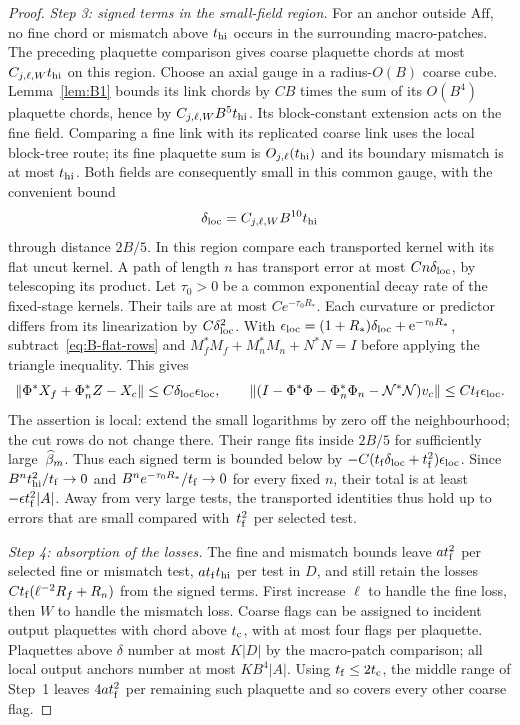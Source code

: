 \begin{proof}
\emph{Step 3: signed terms in the small-field region.} For an anchor outside $\mathrm{Aff}$, no fine chord or mismatch above $t_{\rm hi}$ occurs in the surrounding macro-patches. The preceding plaquette comparison gives coarse plaquette chords at most $C_{j,\ell,W}t_{\rm hi}$ on this region. Choose an axial gauge in a radius-$O(B)$ coarse cube. Lemma~\ref{lem:B1} bounds its link chords by $C B$ times the sum of its $O(B^4)$ plaquette chords, hence by $C_{j,\ell,W}B^5t_{\rm hi}$. Its block-constant extension acts on the fine field. Comparing a fine link with its replicated coarse link uses the local block-tree route; its fine plaquette sum is $O_{j,\ell}(t_{\rm hi})$ and its boundary mismatch is at most $t_{\rm hi}$. Both fields are consequently small in this common gauge, with the convenient bound
\begin{equation*}
\delta_{\rm loc}=C_{j,\ell,W}B^{10}t_{\rm hi}
\end{equation*}
through distance $2B/5$. In this region compare each transported kernel with its flat uncut kernel. A path of length $n$ has transport error at most $Cn\delta_{\rm loc}$, by telescoping its product. Let $\tau_0>0$ be a common exponential decay rate of the fixed-stage kernels. Their tails are at most $Ce^{-\tau_0 R_*}$. Each curvature or predictor differs from its linearization by $C\delta_{\rm loc}^2$. With $\epsilon_{\rm loc}=(1+R_*)\delta_{\rm loc}+\mathrm e^{-\tau_0R_*}$, subtract~\eqref{eq:B-flat-rows} and $M_f^*M_f+M_n^*M_n+N^*N=I$ before applying the triangle inequality. This gives
\begin{equation*}
\|\Phi^*X_f+\Phi_n^*Z-X_c\|\le C\delta_{\rm loc}\epsilon_{\rm loc},\qquad
\|(I-\Phi^*\Phi-\Phi_n^*\Phi_n-\mathcal N^*\mathcal N)v_c\|\le Ct_{\rm f}\epsilon_{\rm loc}.
\end{equation*}
The assertion is local: extend the small logarithms by zero off the neighbourhood; the cut rows do not change there. Their range fits inside $2B/5$ for sufficiently large~$\widehat{\beta}_m$. Thus each signed term is bounded below by $-C(t_{\rm f}\delta_{\rm loc}+t_{\rm f}^2)\epsilon_{\rm loc}$. Since $B^nt_{\rm hi}^2/t_{\rm f}\to0$ and $B^ne^{-\tau_0 R_*}/t_{\rm f}\to0$ for every fixed $n$, their total is at least $-\epsilon t_{\rm f}^2|A|$. Away from very large tests, the transported identities thus hold up to errors that are small compared with~$t_{\rm f}^2$ per selected test.

\emph{Step 4: absorption of the losses.} The fine and mismatch bounds leave $at_{\rm f}^2$ per selected fine or mismatch test, $at_{\rm f}t_{\rm hi}$ per test in $D$, and still retain the losses $Ct_{\rm f}(\ell^{-2}R_f+R_n)$ from the signed terms. First increase $\ell$ to handle the fine loss, then $W$ to handle the mismatch loss. Coarse flags can be assigned to incident output plaquettes with chord above $t_{\rm c}$, with at most four flags per plaquette. Plaquettes above $\delta$ number at most $K|D|$ by the macro-patch comparison; all local output anchors number at most $KB^4|A|$. Using $t_{\rm f}\le2t_{\rm c}$, the middle range of Step~1 leaves $4at_{\rm f}^2$ per remaining such plaquette and so covers every other coarse flag.


\end{proof}
